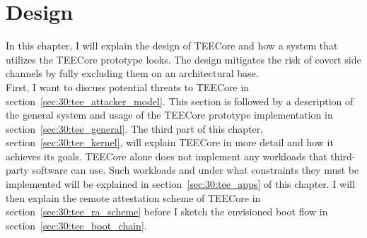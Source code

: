\chapter{Design}
\label{sec:design}



In this chapter, I will explain the design of TEECore and how a system that
utilizes the TEECore prototype looks. The design mitigates the risk of
covert side channels by fully excluding them on an architectural base.\\

First, I want to discuss potential threats to TEECore in
section~\ref{sec:30:tee_attacker_model}. This section is followed by a
description of the general system and usage of the TEECore prototype
implementation in section~\ref{sec:30:tee_general}. The third part of this
chapter, section~\ref{sec:30:tee_kernel}, will explain TEECore in more detail
and how it achieves its goals. TEECore alone does not implement any workloads
that third-party software can use. Such workloads and under what constraints
they must be implemented will be explained in section~\ref{sec:30:tee_apps} of
this chapter. I will then explain the remote attestation scheme of TEECore in
section~\ref{sec:30:tee_ra_scheme} before I sketch the envisioned boot flow in
section~\ref{sec:30:tee_boot_chain}.

